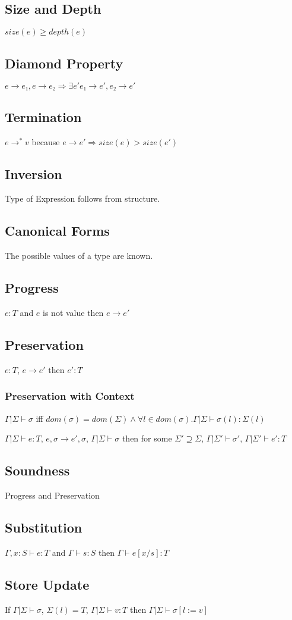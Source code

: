 \documentclass[10pt,a4paper]{article}
\begin{document}
\subsection{Size and Depth}
$size(e) \ge depth(e)$

\subsection{Diamond Property}
$e → e₁, e → e₂ ⇒ ∃e' e₁ → e', e₂ → e'$

\subsection{Termination}
$e →^* v$ because $e → e' ⇒ size(e) > size(e')$

\subsection{Inversion}
Type of Expression follows from structure.

\subsection{Canonical Forms}
The possible values of a type are known.

\subsection{Progress}
$e:T$ and $e$ is not value then $e → e'$

\subsection{Preservation}
$e:T$, $e→e'$ then $e':T$
\subsubsection{Preservation with Context}
$Γ|Σ \vdash σ$ iff $dom(σ) = dom(Σ) ∧ ∀l ∈ dom(σ). Γ|Σ \vdash σ(l) : Σ(l)$

$Γ|Σ \vdash e: T$, $e, σ → e', σ$, $Γ|Σ \vdash σ$ then for some $Σ' \supseteq Σ$, $Γ|Σ' \vdash σ'$, $Γ|Σ' \vdash e' : T$

\subsection{Soundness}
Progress and Preservation

\subsection{Substitution}
$Γ, x: S \vdash e:T$ and $Γ \vdash s: S$ then $Γ \vdash e[x/s]:T$

\subsection{Store Update}
If $Γ|Σ \vdash σ$, $Σ(l)= T$, $Γ|Σ \vdash v:T$ then $Γ|Σ \vdash σ[l := v]$
\end{document}
